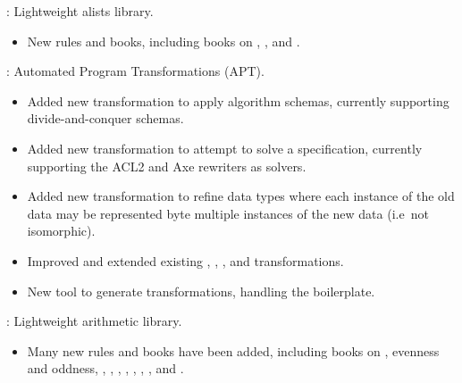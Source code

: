 
\begin{frame}

\implibtitle

:
Lightweight alists library.
\begin{itemize}
\item New rules and books, including books on ,
  , and .
\end{itemize}

\end{frame}


\begin{frame}

\implibtitle

:
Automated Program Transformations (APT).
\begin{itemize}
\item Added new  transformation to apply algorithm schemas,
      currently supporting divide-and-conquer schemas.
\item Added new  transformation to attempt to solve a specification,
      currently supporting the ACL2 and Axe rewriters as solvers.
\item Added new  transformation to refine data types
      where each instance of the old data may be represented byte
      multiple instances of the new data (i.e\ not isomorphic).
\item Improved and extended existing
      , , , and 
      transformations.
\item New  tool to generate transformations, handling
      the boilerplate.
\end{itemize}

\end{frame}


\begin{frame}

\implibtitle

:
Lightweight arithmetic library.
\begin{itemize}
\item Many new rules and books have been added, including books on
 , evenness and oddness,
, , , , ,
\code{<=}, , and .
\end{itemize}

\end{frame}

